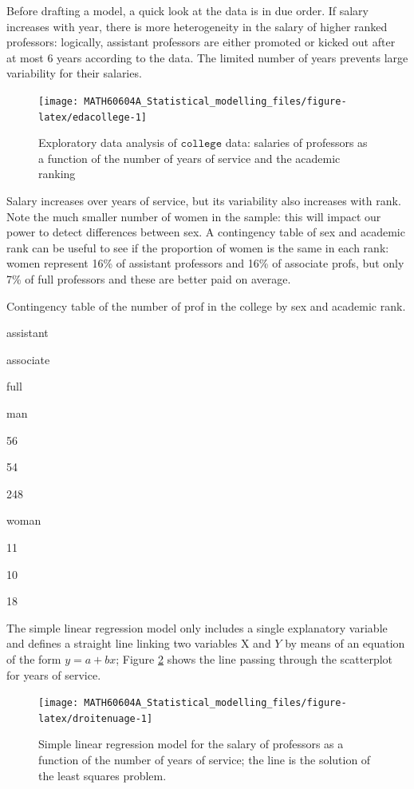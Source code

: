 \documentclass[
  11pt,
  letterpaper,
]{book}
\theoremstyle{definition}
\theoremstyle{definition}
\theoremstyle{definition}
\theoremstyle{remark}
\begin{document}
Before drafting a model, a quick look at the data is in due order. If salary increases with year, there is more heterogeneity in the salary of higher ranked professors: logically, assistant professors are either promoted or kicked out after at most 6 years according to the data. The limited number of years prevents large variability for their salaries.

\begin{figure}

{\centering \texttt{[image: MATH60604A\_Statistical\_modelling\_files/figure-latex/edacollege-1]} 

}

\caption{Exploratory data analysis of $\texttt{college}$ data: salaries of professors as a function of the number of years of service and the academic ranking}\label{fig:edacollege}
\end{figure}

Salary increases over years of service, but its variability also increases with rank. Note the much smaller number of women in the sample: this will impact our power to detect differences between sex. A contingency table of sex and academic rank can be useful to see if the proportion of women is the same in each rank: women represent 16\% of assistant professors and 16\% of associate profs, but only 7\% of full professors and these are better paid on average.

\label{tab:tableaucontingence}Contingency table of the number of prof in the college by sex and academic rank.

assistant

associate

full

man

56

54

248

woman

11

10

18

The simple linear regression model only includes a single explanatory variable and defines a straight line linking two variables \(\mathrm{X}\) and \(Y\) by means of an equation of the form \(y=a+bx\); Figure \ref{fig:droitenuage} shows the line passing through the scatterplot for years of service.

\begin{figure}

{\centering \texttt{[image: MATH60604A\_Statistical\_modelling\_files/figure-latex/droitenuage-1]} 

}

\caption{Simple linear regression model for the salary of professors as a function of the number of years of service; the line is the solution of the least squares problem.}\label{fig:droitenuage}
\end{figure}
\end{document}
